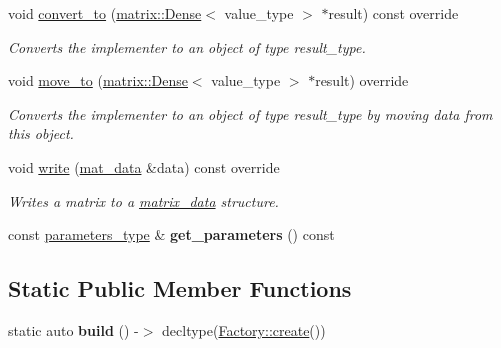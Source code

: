 \begin{DoxyCompactItemize}
void \hyperlink{classgko_1_1preconditioner_1_1Jacobi_a54ce952ac4a12c3f4686442375cd4dc8}{convert\+\_\+to} (\hyperlink{classgko_1_1matrix_1_1Dense}{matrix\+::\+Dense}$<$ value\+\_\+type $>$ $\ast$result) const override
\begin{DoxyCompactList}\small\item\em Converts the implementer to an object of type result\+\_\+type. \end{DoxyCompactList}\item 
void \hyperlink{classgko_1_1preconditioner_1_1Jacobi_a6d5e28b3033772bfc6c96fbe3caca003}{move\+\_\+to} (\hyperlink{classgko_1_1matrix_1_1Dense}{matrix\+::\+Dense}$<$ value\+\_\+type $>$ $\ast$result) override
\begin{DoxyCompactList}\small\item\em Converts the implementer to an object of type result\+\_\+type by moving data from this object. \end{DoxyCompactList}\item 
void \hyperlink{classgko_1_1preconditioner_1_1Jacobi_ac52bb1c70d4882876da1ee21c3b124ee}{write} (\hyperlink{structgko_1_1matrix__data}{mat\+\_\+data} \&data) const override
\begin{DoxyCompactList}\small\item\em Writes a matrix to a \hyperlink{structgko_1_1matrix__data}{matrix\+\_\+data} structure. \end{DoxyCompactList}\item 
\mbox{\label{classgko_1_1preconditioner_1_1Jacobi_a7410d911899907737de500aa4a70e06a}} 
const \hyperlink{structgko_1_1preconditioner_1_1Jacobi_1_1parameters__type}{parameters\+\_\+type} \& {\bfseries get\+\_\+parameters} () const
\end{DoxyCompactItemize}
\subsection*{Static Public Member Functions}
\begin{DoxyCompactItemize}
\item 
\mbox{\label{classgko_1_1preconditioner_1_1Jacobi_aa2a54b4192edefad9f20c2db2b52bbda}} 
static auto {\bfseries build} () -\/$>$ decltype(\hyperlink{classgko_1_1EnableDefaultFactory_a1d077101d9e788e6c65f088612d14cc3}{Factory\+::create}())
\end{DoxyCompactItemize}
